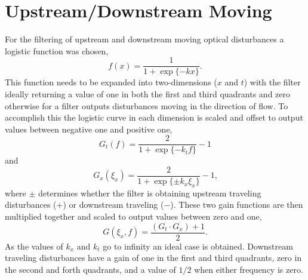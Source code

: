 \section{Upstream/Downstream Moving}
For the filtering of upstream and downstream moving optical disturbances a logistic function was chosen,
\begin{equation}
 f(x) = \frac{1}{1+\exp\{-kx\}} \textrm{.}
 \label{eqn:06_logistic}
\end{equation}
This function needs to be expanded into two-dimensions ($x$ and $t$) with the filter ideally returning a value of one in both the first and third quadrants and zero otherwise for a filter outputs disturbances moving in the direction of flow.
To accomplish this the logistic curve in each dimension is scaled and offset to output values between negative one and positive one,
\begin{equation}
 G_t(f) = \frac{2}{1+\exp\{-k_tf\}}-1
 \label{eqn:06_logistic_time}
\end{equation}
and
\begin{equation}
 G_x(\xi_x) = \frac{2}{1+\exp\{\pm k_x\xi_x\}}-1 \textrm{,}
 \label{eqn:06_logistic_space}
\end{equation}
where $\pm$ determines whether the filter is obtaining upstream traveling disturbances ($+$) or downstream traveling ($-$).
These two gain functions are then multiplied together and scaled to output values between zero and one,
\begin{equation}
 G(\xi_x,f) = \frac{(G_t\cdot G_x)+1}{2} \textrm{.}
 \label{eqn:06_up_down_filter}
\end{equation}
As the values of $k_x$ and $k_t$ go to infinity an ideal case is obtained.
Downstream traveling disturbances have a gain of one in the first and third quadrants, zero in the second and forth quadrants, and a value of $1/2$ when either frequency is zero.

